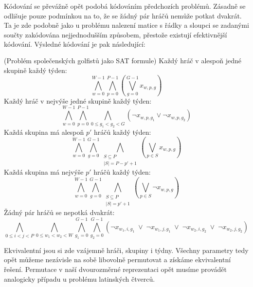 Kódování se převážně opět podobá kódováním předchozích problémů. Zásadně se odlišuje pouze podmínkou na to, že se žádný pár hráčů nemůže potkat dvakrát. Ta je zde podobně jako u problému nalezení matice s řádky a sloupci se zadanými součty zakódována nejjednodušším způsobem, přestože existují efektivnější kódování. Výsledné kódování je pak následující:
\begin{pozn}{(Problém společenských golfistů jako SAT formule)}
Každý hráč v alespoň jedné skupině každý týden:
\[
\bigwedge_{w=0}^{W-1} \bigwedge_{p=0}^{P-1}
\left( \bigvee_{g=0}^{G-1} x_{w,p,g} \right)
\]
Každý hráč v nejvýše jedné skupině každý týden:
\[
\bigwedge_{w=0}^{W-1} \bigwedge_{p=0}^{P-1}
\bigwedge_{0 \le g_1 < g_2 < G}
\left( \neg x_{w,p,g_1} \vee \neg x_{w,p,g_2} \right)
\]
Každá skupina má alespoň $p'$ hráčů každý týden:
\[
\bigwedge_{w=0}^{W-1} \bigwedge_{g=0}^{G-1}
\bigwedge_{\substack{S \subseteq P \\ |S| = P - p' + 1}}
\left( \bigvee_{p \in S} x_{w,p,g} \right)
\]
Každá skupina má nejvýše $p'$ hráčů každý týden:
\[
\bigwedge_{w=0}^{W-1} \bigwedge_{g=0}^{G-1}
\bigwedge_{\substack{S \subseteq P \\ |S| = p' + 1}}
\left( \bigvee_{p \in S} \neg x_{w,p,g} \right)
\]
Žádný pár hráčů se nepotká dvakrát:
\[
\bigwedge_{0 \le i < j < P}
\bigwedge_{0 \le w_1 < w_2 < W}
\bigwedge_{g_1=0}^{G-1} \bigwedge_{g_2=0}^{G-1}
\left(
\neg x_{w_1,i,g_1} \;\vee\;
\neg x_{w_1,j,g_1} \;\vee\;
\neg x_{w_2,i,g_2} \;\vee\;
\neg x_{w_2,j,g_2}
\right)
\]
\end{pozn}

Ekvivalentní jsou si zde vzájemně hráči, skupiny i týdny. Všechny parametry tedy opět můžeme nezávisle na sobě libovolně permutovat a získáme ekvivalentní řešení. Permutace v naší dvourozměrné reprezentaci opět musíme provádět analogicky případu u problému latinských čtverců.